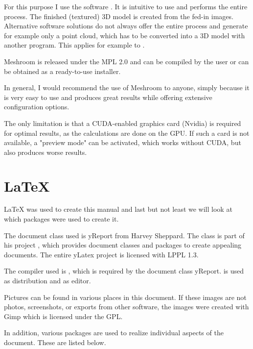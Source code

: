 For this purpose I use the software . It is intuitive to use and performs the entire process. The finished (textured) 3D model is created from the fed-in images. Alternative software solutions do not always offer the entire process and generate for example only a point cloud, which has to be converted into a 3D model with another program. This applies for example to .%

Meshroom is released under the MPL 2.0 and can be compiled by the user or can be obtained as a ready-to-use installer.%

In general, I would recommend the use of Meshroom to anyone, simply because it is very easy to use and produces great results while offering extensive configuration options.%

The only limitation is that a CUDA-enabled graphics card (Nvidia) is required for optimal results, as the calculations are done on the GPU. If such a card is not available, a "preview mode" can be activated, which works without CUDA, but also produces worse results.%

\section{\LaTeX}%
\LaTeX{} was used to create this manual and last but not least we will look at which packages were used to create it.%

The document class used is yReport from Harvey Sheppard. The class is part of his project {\faGithub} , which provides document classes and packages to create appealing documents. The entire yLatex project is licensed with LPPL 1.3.%

The compiler used is , which is required by the document class yReport.  is used as  distribution and  as editor.%

Pictures can be found in various places in this document. If these images are not photos, screenshots, or exports from other software, the images were created with Gimp which is licensed under the GPL.%

In addition, various packages are used to realize individual aspects of the document. These are listed below.%

